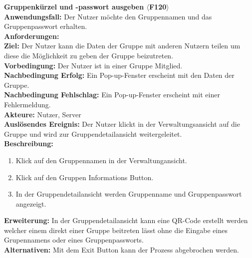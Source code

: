 \documentclass[parskip=full]{scrartcl}
\begin{document}
\textbf{Gruppenkürzel und -passwort ausgeben $\langle$F120$\rangle$}\\
\textbf{Anwendungsfall:} Der Nutzer möchte den Gruppennamen und das Gruppenpasswort erhalten.\\
\textbf{Anforderungen:} \\
\textbf{Ziel:} Der Nutzer kann die Daten der Gruppe mit anderen Nutzern teilen um diese die Möglichkeit zu geben der Gruppe beizutreten.\\
\textbf{Vorbedingung:} Der Nutzer ist in einer Gruppe Mitglied.\\
\textbf{Nachbedingung Erfolg:} Ein Pop-up-Fenster erscheint mit den Daten der Gruppe.\\
\textbf{Nachbedingung Fehlschlag:} Ein Pop-up-Fenster erscheint mit einer Fehlermeldung.\\
\textbf{Akteure:} Nutzer, Server \\
\textbf{Auslösendes Ereignis:} Der Nutzer klickt in der Verwaltungsansicht auf die Gruppe und wird zur Gruppendetailansicht weitergeleitet.\\
\textbf{Beschreibung:}
\begin{enumerate}
    \item Klick auf den Gruppennamen in der Verwaltungansicht.
    \item Klick auf den Gruppen Informations Button.
    \item In der Gruppendetailansicht werden Gruppenname und Gruppenpasswort angezeigt.
\end{enumerate}
\textbf{Erweiterung:} In der Gruppendetailansicht kann eine QR-Code erstellt werden welcher einem direkt einer Gruppe beitreten lässt ohne die Eingabe eines Grupennamens oder eines Gruppenpassworts. \\
\textbf{Alternativen:} Mit dem Exit Button kann der Prozess abgebrochen werden.\\
\newpage
\end{document}
